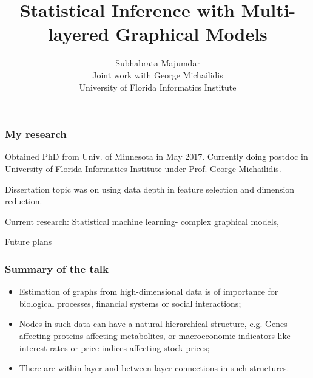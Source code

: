 \documentclass[10pt]{beamer}
\title[ Multi-layered Graphical Models]
{\Large  
Statistical Inference with Multi-layered Graphical Models}
\author[Majumdar and Michailidis]{Subhabrata Majumdar\\
{\footnotesize Joint work with George Michailidis\\
University of Florida Informatics Institute}}
\institute[]{AT\&T Labs - Research, Bedminster, NJ\\
April 5, 2018}
\date{}
\date[April 5, 2018]
\theoremstyle{definition}
\begin{document}

\frame{ \titlepage}

\begin{frame}
\frametitle{My research}

\begin{outline}
\1 Obtained PhD from Univ. of Minnesota in May 2017. Currently doing postdoc in University of Florida Informatics Institute under Prof. George Michailidis.

\vspace{1em}
\1 Dissertation topic was on using data depth in feature selection and dimension reduction.

\vspace{1em}
\1 Current research: Statistical machine learning- complex graphical models,

\vspace{1em}
\1 Future plans
\end{outline}
\end{frame}


\begin{frame}
\frametitle{Summary of the talk}
\begin{itemize}
\item Estimation of graphs from high-dimensional data is of importance for biological processes, financial systems or social interactions;

\vspace{1em}
\item Nodes in such data can have a natural hierarchical structure, e.g. Genes affecting proteins affecting metabolites, or macroeconomic indicators like interest rates or price indices affecting stock prices;

\vspace{1em}
\item There are within layer and between-layer connections in such structures.
\end{itemize}
\end{frame}
\end{document}
